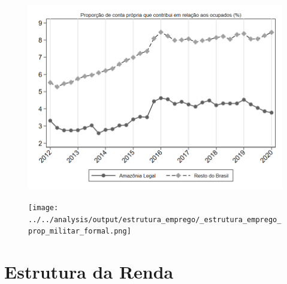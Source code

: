 \documentclass[11pt]{beamer}
\begin{document}
\begin{frame}[label=_estrutura_emprego_prop_cpropriaC]{}
\begin{figure}
  \centering
  \includegraphics[width=1.0\linewidth]{../../analysis/output/estrutura_emprego/_estrutura_emprego_prop_cpropriaC.png}
  \caption{}
  \label{fig:_estrutura_emprego_prop_cpropriaC}
\end{figure}
\end{frame}

\begin{frame}[label=_estrutura_emprego_prop_militar_formal]{}
\begin{figure}
  \centering
  \texttt{[image: ../../analysis/output/estrutura\_emprego/\_estrutura\_emprego\_prop\_militar\_formal.png]}
  \caption{}
  \label{fig:_estrutura_emprego_prop_militar_formal}
\end{figure}
\end{frame}


\section{Estrutura da Renda}
\end{document}
